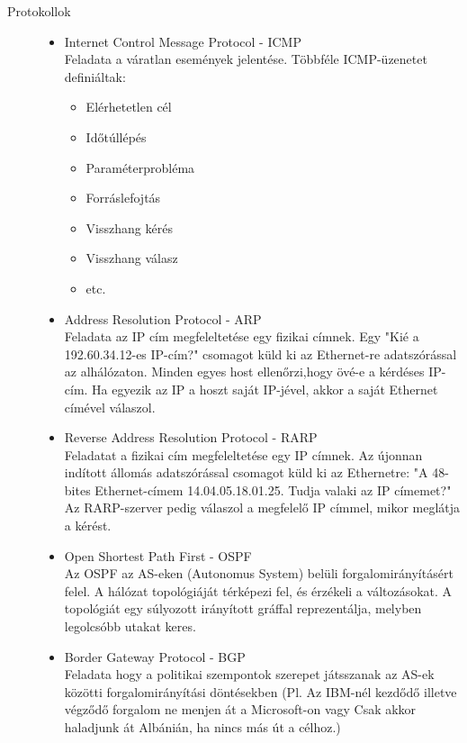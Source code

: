 \documentclass[margin=0px]{article}
\begin{document}
\begin{description}
\begin{itemize}
        \end{itemize}
    \item[Protokollok] \hfill
        \begin{itemize}
            \item Internet Control Message Protocol - ICMP \\
                  Feladata a váratlan események jelentése. Többféle ICMP-üzenetet definiáltak:
                  \begin{itemize}
                      \item Elérhetetlen cél
                      \item Időtúllépés
                      \item Paraméterprobléma
                      \item Forráslefojtás
                      \item Visszhang kérés
                      \item Visszhang válasz
                      \item etc.
                  \end{itemize}
            \item Address Resolution Protocol - ARP \\
                  Feladata az IP cím megfeleltetése egy fizikai címnek. Egy "Kié a 192.60.34.12-es IP-cím?" csomagot küld ki az Ethernet-re adatszórással az alhálózaton. Minden egyes host ellenőrzi,hogy övé-e a kérdéses IP-cím. Ha egyezik az IP a hoszt saját IP-jével, akkor a saját Ethernet címével válaszol.
            \item Reverse Address Resolution Protocol - RARP \\
                  Feladatat a fizikai cím megfeleltetése egy IP címnek. Az újonnan indított állomás adatszórással csomagot küld ki az Ethernetre: "A 48-bites Ethernet-címem 14.04.05.18.01.25. Tudja valaki az IP címemet?" Az RARP-szerver pedig válaszol a megfelelő IP címmel, mikor meglátja a kérést.
            \item Open Shortest Path First - OSPF \\
                  Az OSPF az AS-eken (Autonomus System) belüli forgalomirányításért felel. A hálózat topológiáját térképezi fel, és érzékeli a változásokat. A topológiát egy súlyozott irányított gráffal reprezentálja, melyben legolcsóbb utakat keres.
            \item Border Gateway Protocol - BGP \\
                  Feladata hogy a politikai szempontok szerepet játsszanak az AS-ek közötti forgalomirányítási döntésekben (Pl. Az IBM-nél kezdődő illetve végződő forgalom ne menjen át a Microsoft-on vagy Csak akkor haladjunk át Albánián, ha nincs más út a célhoz.)\\

\end{itemize}
\end{description}
\end{document}

